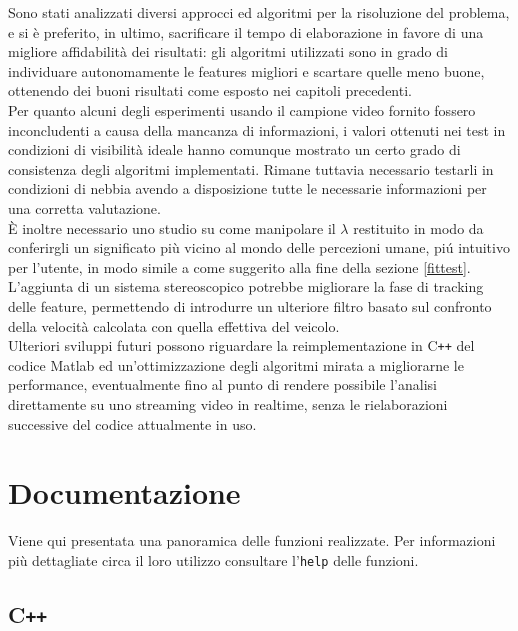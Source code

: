 \documentclass[12pt]{report}
\begin{document}
\noindent Sono stati analizzati diversi approcci ed algoritmi per la risoluzione del problema, e si \`e preferito, in ultimo, sacrificare il tempo di elaborazione in favore di una migliore affidabilit\`a dei risultati: gli algoritmi utilizzati sono in grado di individuare autonomamente le features migliori e scartare quelle meno buone, ottenendo dei buoni risultati come esposto nei capitoli precedenti.\\

\noindent Per quanto alcuni degli esperimenti usando il campione video fornito fossero inconcludenti a causa della mancanza di informazioni, i valori ottenuti nei test in condizioni di visibilit\`a ideale hanno comunque mostrato un certo grado di consistenza degli algoritmi implementati. Rimane tuttavia necessario testarli in condizioni di nebbia avendo a disposizione tutte le necessarie informazioni per una corretta valutazione.\\

\noindent \`E inoltre necessario uno studio su come manipolare il $\lambda$ restituito in modo da conferirgli un significato pi\`u vicino al mondo delle percezioni umane, pi\'u intuitivo per l'utente, in modo simile a come suggerito alla fine della sezione \ref{fittest}.\\

\noindent L'aggiunta di un sistema stereoscopico potrebbe migliorare la fase di tracking delle feature, permettendo di introdurre un ulteriore filtro basato sul confronto della velocit\`a calcolata con quella effettiva del veicolo.\\

\noindent Ulteriori sviluppi futuri possono riguardare la reimplementazione in C\verb|++| del codice Matlab ed un'ottimizzazione degli algoritmi mirata a migliorarne le performance, eventualmente fino al punto di rendere possibile l'analisi direttamente su uno streaming video in realtime, senza le rielaborazioni successive del codice attualmente in uso.\\




\chapter{Documentazione}


Viene qui presentata una panoramica delle funzioni realizzate. Per informazioni pi\`u dettagliate circa il loro utilizzo consultare l'\verb|help| delle funzioni.

\section[C++]{C\verb_++_}
\end{document}
